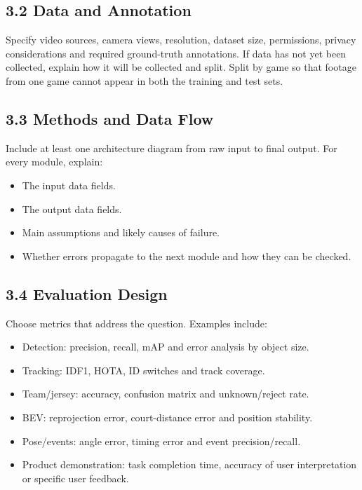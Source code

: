 \documentclass[11pt,a4paper]{article}
\begin{document}
\subsection{3.2 Data and Annotation}

Specify video sources, camera views, resolution, dataset size, permissions, privacy considerations and required ground-truth annotations. If data has not yet been collected, explain how it will be collected and split. Split by game so that footage from one game cannot appear in both the training and test sets.

\subsection{3.3 Methods and Data Flow}

Include at least one architecture diagram from raw input to final output. For every module, explain:

\begin{itemize}[leftmargin=1.6em,itemsep=3pt]
  \item The input data fields.
  \item The output data fields.
  \item Main assumptions and likely causes of failure.
  \item Whether errors propagate to the next module and how they can be checked.
\end{itemize}

\subsection{3.4 Evaluation Design}

Choose metrics that address the question. Examples include:

\begin{itemize}[leftmargin=1.6em,itemsep=3pt]
  \item Detection: precision, recall, mAP and error analysis by object size.
  \item Tracking: IDF1, HOTA, ID switches and track coverage.
  \item Team/jersey: accuracy, confusion matrix and unknown/reject rate.
  \item BEV: reprojection error, court-distance error and position stability.
  \item Pose/events: angle error, timing error and event precision/recall.
  \item Product demonstration: task completion time, accuracy of user interpretation or specific user feedback.
\end{itemize}
\end{document}
